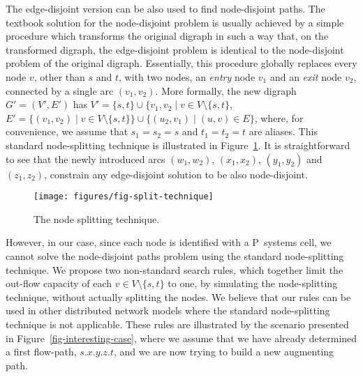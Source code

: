 \documentclass[preliminary,copyright,creativecommons]{eptcs}
\theoremstyle{remark}
\begin{document}
The edge-disjoint version can be also used to find node-disjoint paths.
The textbook solution for the node-disjoint problem is usually 
achieved by a simple procedure which transforms the original digraph
in such a way that, on the transformed digraph,
the edge-disjoint problem is identical to 
the node-disjoint problem of the original digraph. 
Essentially, this procedure globally replaces every node $v$, 
other than $s$ and $t$, with two nodes,
an \emph{entry} node $v_{1}$ and an \emph{exit} node $v_{2}$,
connected by a single arc $(v_1,v_2)$. 
More formally, the new digraph $G' = (V', E')$ has
$V' = \{ s, t \} \cup \{ v_1, v_2 \mid v \in V \setminus \{s,t\}$, 
$E' = \{ (v_1, v_2) \mid v \in V \setminus \{s,t\} \} \cup \{ (u_2,v_1) \mid (u,v) \in E \}$,
where, for convenience, we assume that $s_1=s_2=s$ and $t_1=t_2=t$ are aliases.
This standard node-splitting technique is illustrated in Figure~\ref{fig-split-technique}.
It is straightforward to see that the newly introduced arcs
$(w_1,w_2)$, $(x_1,x_2)$, $(y_1,y_2)$ and $(z_1,z_2)$,
constrain any edge-disjoint solution to be also node-disjoint.

\begin{figure}[h]
\centerline{\texttt{[image: figures/fig-split-technique]}}
\caption{The node splitting technique.}
\label{fig-split-technique}
\end{figure}

However, in our case,
since each node is identified with a P~systems cell,
we cannot solve the node-disjoint paths problem
using the standard node-splitting technique.
We propose two non-standard search rules, 
which together limit the out-flow capacity of each $v \in V\setminus \{s,t\}$ to one,
by simulating the node-splitting technique, without actually splitting the nodes.
We believe that our rules can be used in other distributed network models where 
the standard node-splitting technique is not applicable.
These rules are illustrated by the scenario presented in Figure~\ref{fig-interesting-case},
where we assume that we have already determined a first flow-path, $s$.$x$.$y$.$z$.$t$,
and we are now trying to build a new augmenting path.
\end{document}
